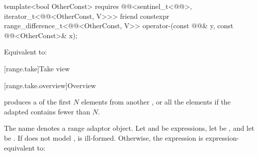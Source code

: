 %
\begin{itemdecl}
template<bool OtherConst>
  requires @@<sentinel_t<@@>, iterator_t<@@<OtherConst, V>>>
friend constexpr range_difference_t<@@<OtherConst, V>>
  operator-(const @@& y, const @@<OtherConst>& x);
\end{itemdecl}

\begin{itemdescr}
\pnum
\effects
Equivalent to: 
\end{itemdescr}

[range.take]{Take view}

[range.take.overview]{Overview}

\pnum
{} produces a  of the first $N$ elements
from another , or all the elements if the adapted
 contains fewer than $N$.

\pnum
{}%
The name  denotes a
range adaptor object.
Let  and  be expressions,
let  be , and
let  be .
If  does not model
,
 is ill-formed.
Otherwise, the expression 
is expression-equivalent to:

